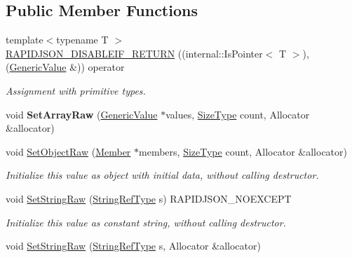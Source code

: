 \subsection*{Public Member Functions}
\begin{DoxyCompactItemize}
\item 
{\footnotesize template$<$typename T $>$ }\\\hyperlink{class_generic_value_a4a4418a93777942e1fb7ea71f8aaf680}{R\+A\+P\+I\+D\+J\+S\+O\+N\+\_\+\+D\+I\+S\+A\+B\+L\+E\+I\+F\+\_\+\+R\+E\+T\+U\+RN} ((internal\+::\+Is\+Pointer$<$ T $>$),(\hyperlink{class_generic_value}{Generic\+Value} \&)) operator
\begin{DoxyCompactList}\small\item\em Assignment with primitive types. \end{DoxyCompactList}\item 
void {\bfseries Set\+Array\+Raw} (\hyperlink{class_generic_value}{Generic\+Value} $\ast$values, \hyperlink{rapidjson_8h_a5ed6e6e67250fadbd041127e6386dcb5}{Size\+Type} count, Allocator \&allocator)\hypertarget{class_generic_value_a8f5f309065479de40a16cf28a340da65}{}\label{class_generic_value_a8f5f309065479de40a16cf28a340da65}

\item 
void \hyperlink{class_generic_value_a26c8ec7d68858df1038506df7fcff22d}{Set\+Object\+Raw} (\hyperlink{class_generic_value_a7ccf27c44058b4c11c3efc6473afb886}{Member} $\ast$members, \hyperlink{rapidjson_8h_a5ed6e6e67250fadbd041127e6386dcb5}{Size\+Type} count, Allocator \&allocator)\hypertarget{class_generic_value_a26c8ec7d68858df1038506df7fcff22d}{}\label{class_generic_value_a26c8ec7d68858df1038506df7fcff22d}

\begin{DoxyCompactList}\small\item\em Initialize this value as object with initial data, without calling destructor. \end{DoxyCompactList}\item 
void \hyperlink{class_generic_value_a1451603922dcdf34976f125dc60f70ee}{Set\+String\+Raw} (\hyperlink{class_generic_value_a32e0f30ee278072374c8168b14d3317f}{String\+Ref\+Type} s) R\+A\+P\+I\+D\+J\+S\+O\+N\+\_\+\+N\+O\+E\+X\+C\+E\+PT\hypertarget{class_generic_value_a1451603922dcdf34976f125dc60f70ee}{}\label{class_generic_value_a1451603922dcdf34976f125dc60f70ee}

\begin{DoxyCompactList}\small\item\em Initialize this value as constant string, without calling destructor. \end{DoxyCompactList}\item 
void \hyperlink{class_generic_value_ad3d91db36dfdbfc1af40a79aae07723c}{Set\+String\+Raw} (\hyperlink{class_generic_value_a32e0f30ee278072374c8168b14d3317f}{String\+Ref\+Type} s, Allocator \&allocator)\hypertarget{class_generic_value_ad3d91db36dfdbfc1af40a79aae07723c}{}\label{class_generic_value_ad3d91db36dfdbfc1af40a79aae07723c}


\end{DoxyCompactItemize}
